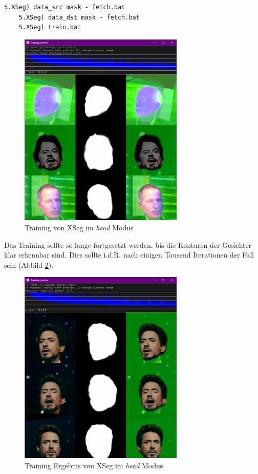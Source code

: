 \begin{lstlisting}[label={lst:extraction-7},numbers=none]
    5.XSeg) data_src mask - fetch.bat
    5.XSeg) data_dst mask - fetch.bat
    5.XSeg) train.bat
\end{lstlisting}
\begin{figure}
    \center
    \includegraphics[width=0.7\textwidth]{Bilder/DFL/XSegEditor-4-train-1}
    \caption{Training von XSeg im \textit{head} Modus}
    \label{fig:xseg-train}
\end{figure}

Das Training sollte so lange fortgesetzt werden, bis die Konturen der Gesichter klar erkennbar sind.
Dies sollte i.d.R. nach einigen Tausend Iterationen der Fall sein (Abbild \ref{fig:xseg-train-result}).

\begin{figure}
    \center
    \includegraphics[width=0.7\textwidth]{Bilder/DFL/XSegEditor-4-train-3}
    \caption{Training Ergebnis von XSeg im \textit{head} Modus}
    \label{fig:xseg-train-result}
\end{figure}

